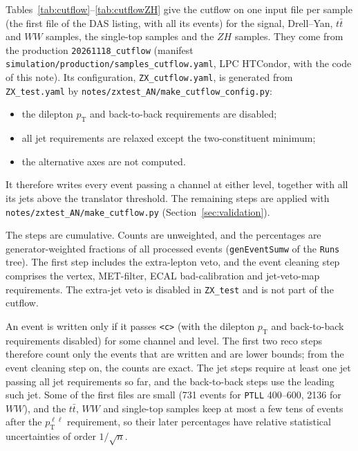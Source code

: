 \documentclass[11pt]{article}
\newcommand{\pt}{p_{\mathrm{T}}}
\newcommand{\ptll}{\pt^{\ell\ell}}
\newcommand{\code}[1]{\texttt{#1}}
\begin{document}
Tables~\ref{tab:cutflow}--\ref{tab:cutflowZH} give the cutflow on one input file per sample (the first file of the DAS
listing, with all its events) for the signal, Drell--Yan, $t\bar t$ and $WW$ samples, the single-top samples and the
$ZH$ samples. They come from the production \code{20261118\_cutflow} (manifest
\code{simulation/production/samples\_cutflow.yaml}, LPC HTCondor, with the code of this note). Its configuration,
\code{ZX\_cutflow.yaml}, is generated from \code{ZX\_test.yaml} by \code{notes/zxtest\_AN/make\_cutflow\_config.py}:
\begin{itemize}
\item the dilepton $\pt$ and back-to-back requirements are disabled;
\item all jet requirements are relaxed except the two-constituent minimum;
\item the alternative axes are not computed.
\end{itemize}
It therefore writes every event passing a channel at either level, together with all its jets above the translator
threshold. The remaining steps are applied with \code{notes/zxtest\_AN/make\_cutflow.py}
(Section~\ref{sec:validation}).

The steps are cumulative. Counts are unweighted, and the percentages are generator-weighted fractions of all processed
events (\code{genEventSumw} of the \code{Runs} tree). The first step includes the extra-lepton veto, and the event
cleaning step comprises the vertex, MET-filter, ECAL bad-calibration and jet-veto-map requirements. The extra-jet veto is
disabled in \code{ZX\_test} and is not part of the cutflow.

An event is written only if it passes \code{<c>} (with the dilepton $\pt$ and back-to-back requirements disabled) for some
channel and level. The first two reco steps therefore count only the events that are written and are lower bounds; from
the event cleaning step on, the counts are exact. The jet steps require at least one jet passing all jet requirements so
far, and the back-to-back steps use the leading such jet. Some of the first files are small (731 events for
\code{PTLL} 400--600, 2136 for $WW$), and the $t\bar t$, $WW$ and single-top samples keep at most a few tens of events
after the $\ptll$ requirement, so their later percentages have relative statistical uncertainties of order
$1/\sqrt{n}$.
\end{document}
